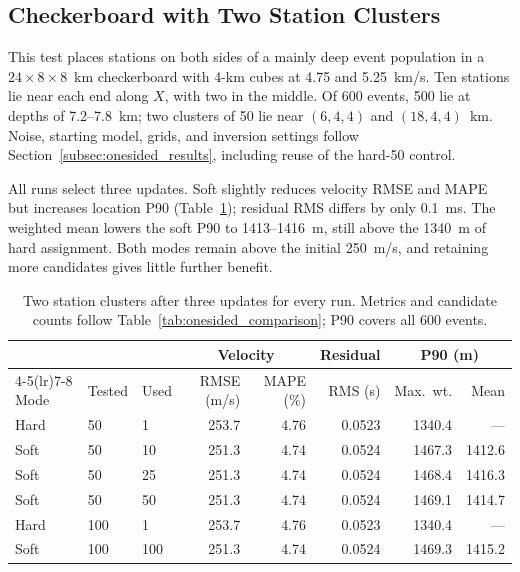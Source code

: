 \subsection{Checkerboard with Two Station Clusters}
\label{subsec:two_clusters_results}

This test places stations on both sides of a mainly deep event population in a $24\times8\times8$~km checkerboard with 4-km cubes at 4.75 and 5.25~km/s. Ten stations lie near each end along $X$, with two in the middle. Of 600 events, 500 lie at depths of 7.2--7.8~km; two clusters of 50 lie near $(6,4,4)$ and $(18,4,4)$~km. Noise, starting model, grids, and inversion settings follow Section~\ref{subsec:onesided_results}, including reuse of the hard-50 control.

All runs select three updates. Soft slightly reduces velocity RMSE and MAPE but increases location P90 (Table~\ref{tab:two_clusters_comparison}); residual RMS differs by only 0.1~ms. The weighted mean lowers the soft P90 to 1413--1416~m, still above the 1340~m of hard assignment. Both modes remain above the initial 250~m/s, and retaining more candidates gives little further benefit.

\begin{table}[!htb]
\centering
\begin{singlespace}
\small
\setlength{\tabcolsep}{3.5pt}
\caption{Two station clusters after three updates for every run. Metrics and candidate counts follow Table~\ref{tab:onesided_comparison}; P90 covers all 600 events.}
\label{tab:two_clusters_comparison}
\smallskip
\begin{tabular}{lllrrrrr}
\toprule
& & & \multicolumn{2}{c}{Velocity} & Residual & \multicolumn{2}{c}{P90 (m)} \\
\cmidrule(lr){4-5}\cmidrule(lr){7-8}
Mode & Tested & Used & RMSE (m/s) & MAPE (\%) & RMS (s) & Max.\ wt. & Mean \\
\midrule
Hard & 50 & 1 & 253.7 & 4.76 & 0.0523 & 1340.4 & --- \\
Soft & 50 & 10 & 251.3 & 4.74 & 0.0524 & 1467.3 & 1412.6 \\
Soft & 50 & 25 & 251.3 & 4.74 & 0.0524 & 1468.4 & 1416.3 \\
Soft & 50 & 50 & 251.3 & 4.74 & 0.0524 & 1469.1 & 1414.7 \\
\addlinespace
Hard & 100 & 1 & 253.7 & 4.76 & 0.0523 & 1340.4 & --- \\
Soft & 100 & 100 & 251.3 & 4.74 & 0.0524 & 1469.3 & 1415.2 \\
\bottomrule
\end{tabular}
\end{singlespace}
\end{table}
\FloatBarrier

